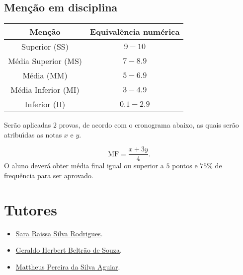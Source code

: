 \subsection*{Menção em disciplina}
\begin{table}[ht!]
  \centering
  \begin{tabular}{|c|c|}
    \hline
    \textbf{Menção}     & \textbf{Equivalência numérica} \\
    \hline
    Superior (SS)       & $9-10$                         \\
    Média Superior (MS) & $7-8.9$                        \\
    Média (MM)          & $5-6.9$                        \\
    Média Inferior (MI) & $3-4.9$                        \\
    Inferior (II)       & $0.1-2.9$                      \\
    \hline
  \end{tabular}
\end{table}

Serão aplicadas $2$ provas, de acordo com o cronograma abaixo, as
quais serão atribuı́das as notas $x$ e $y$.

\[
  \text{MF}=\frac{x+3y}{4}.
\]
O aluno deverá obter média final igual ou superior a $5$ pontos e
$75\%$ de frequência para ser aprovado.
\section*{Tutores}

\begin{itemize}
  \item\href{https://www.escavador.com/sobre/7335541/sara-raissa-silva-rodrigues}{Sara Raissa Silva Rodrigues}.
  \item \href{https://www.escavador.com/sobre/5504138/geraldo-herbert-beltrao-de-souza}{Geraldo Herbert Beltrão de Souza}.
  \item\href{https://www.escavador.com/sobre/5634752/mattheus-pereira-da-silva-aguiar}{Mattheus Pereira da Silva Aguiar}.
\end{itemize}

\vfill
\nocite{*}
\printbibliography[
  title={\textcolor{DarkBlue}{Referências bibliográficas}{\fontspec[Renderer=Harfbuzz]{NotoColorEmoji.ttf}📚}},
  heading=bibintoc
]